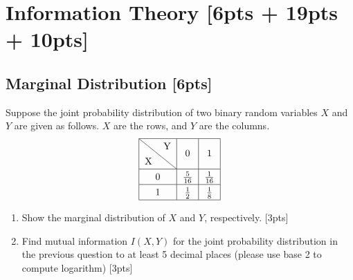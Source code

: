 \documentclass{article}
\begin{document}
\newpage
\section{Information Theory [6pts + 19pts + 10pts]}
\subsection{Marginal Distribution [6pts]}

Suppose the joint probability distribution of two binary random variables $X$ and $Y$ are given as follows. $X$ are the rows, and $Y$ are the columns.
$$\renewcommand*{\arraystretch}{1.3}
\begin{tabular}{|c|c|c|}
    \hline 
    \diagbox{X}{Y} & {0} & {1} \\ 
    \hline 0 & {$\frac{5}{16}$} & {$\frac{1}{16}$} \\ 
    \hline 1 & {$\frac{1}{2}$} & {$\frac{1}{8}$} \\ 
    \hline
\end{tabular}$$

\begin{enumerate}[label=(\alph*)]
    \item Show the marginal distribution of $X$ and $Y$, respectively. [3pts]
    \item Find mutual information $I(X,Y)$ for the joint probability distribution in the previous question to at least 5 decimal places (please use base 2 to compute logarithm) [3pts]
\end{enumerate}
\end{document}
